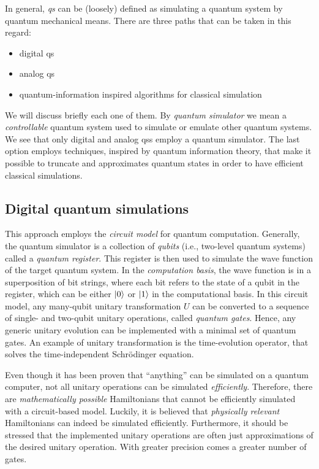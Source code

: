 In general, \emph{\acf{qs}} can be (loosely) defined as simulating a quantum system by quantum mechanical means.
There are three paths that can be taken in this regard:
\begin{itemize}
    \item digital \ac{qs}
    \item analog \ac{qs}
    \item quantum-information inspired algorithms for classical simulation
\end{itemize}
We will discuss briefly each one of them.
By \emph{quantum simulator} we mean a \emph{controllable} quantum system used to simulate or emulate other quantum systems.
We see that only digital and analog \ac{qs}s employ a quantum simulator.
The last option employs techniques, inspired by quantum information theory, that make it possible to truncate and approximates quantum states in order to have efficient classical simulations.



\subsection{Digital quantum simulations}
\label{sub:digital_quantum_simulations}

This approach employs the \emph{circuit model} for quantum computation.
Generally, the quantum simulator is a collection of \emph{qubits} (i.e., two-level quantum systems) called a \emph{quantum register}.
This register is then used to simulate the wave function of the target quantum system.
In the \emph{computation basis}, the wave function is in a superposition of bit strings, where each bit refers to the state of a qubit in the register, which can be either $\ket{0}$ or $\ket{1}$ in the computational basis.
In this circuit model, any many-qubit unitary transformation $U$ can be converted to a sequence of single- and two-qubit unitary operations, called \emph{quantum gates}.
Hence, any generic unitary evolution can be implemented with a minimal set of quantum gates.
An example of unitary transformation is the time-evolution operator, that solves the time-independent Schrödinger equation.

Even though it has been proven \cite{lloyd1996simulator} that ``anything'' can be simulated on a quantum computer, not all unitary operations can be simulated \emph{efficiently}.
Therefore, there are \emph{mathematically possible} Hamiltonians that cannot be efficiently simulated with a circuit-based model.
Luckily, it is believed that \emph{physically relevant} Hamiltonians can indeed be simulated efficiently\citneeded.
Furthermore, it should be stressed that the implemented unitary operations are often just approximations of the desired unitary operation.
With greater precision comes a greater number of gates.

